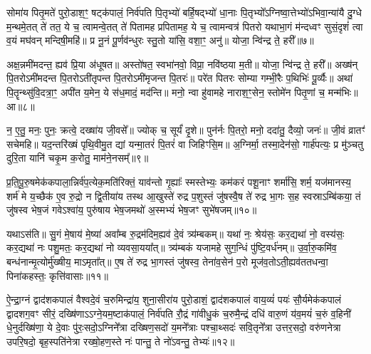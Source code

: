 {\anuvakamend[{ह॒रा॒ नि॒हारं॑ त्रि॒ꣳ॒शच्च॑॥४॥}]}

सोमा॑य पितृ॒मते॑ पुरो॒डाश॒ꣳ॒ षट्क॑पालं॒ निर्व॑पति पि॒तृभ्यो॑ बर्\mbox{}हि॒षद्भ्यो॑ धा॒नाः पि॒तृभ्यो᳚\-ऽग्निष्वा॒त्तेभ्यो॑\-ऽभिवा॒न्या॑यै दु॒ग्धे म॒न्थमे॒तत् ते॑ तत॒ ये च॒ त्वामन्वे॒तत् ते॑ पितामह प्रपितामह॒ ये च॒ त्वामन्वत्र॑ पितरो यथाभा॒गं म॑न्दध्वꣳ सुसं॒दृशं॑ त्वा व॒यं मघ॑वन् मन्दिषी॒महि॑॥ प्र नू॒नं पू॒र्णव॑न्धुरः स्तु॒तो या॑सि॒ वशा॒ꣳ॒ अनु॑॥ योजा॒ न्वि॑न्द्र ते॒ हरी᳚॥७॥

अक्ष॒न्नमी॑मदन्त॒ ह्यव॑ प्रि॒या अ॑धूषत॥ अस्तो॑षत॒ स्वभा॑नवो॒ विप्रा॒ नवि॑ष्ठया म॒ती॥ योजा॒ न्वि॑न्द्र ते॒ हरी᳚॥ अख्ष॑न् पि॒तरो\-ऽमी॑मदन्त पि॒तरो\-ऽती॑तृपन्त पि॒तरो\-ऽमी॑मृजन्त पि॒तरः॑॥ परे॑त पितरः सोम्या गम्भी॒रैः प॒थिभिः॑ पू॒र्व्यैः॥ अथा॑ पि॒तॄन्थ्सु॑वि॒दत्रा॒ꣳ॒ अपी॑त य॒मेन॒ ये स॑ध॒मादं॒ मद॑न्ति॥ मनो॒ न्वा हु॑वामहे नाराश॒ꣳ॒सेन॒ स्तोमे॑न पितृ॒णां च॒ मन्म॑भिः॥ आ॥८॥

न॒ ए॒तु॒ मनः॒ पुनः॒ क्रत्वे॒ दख्षा॑य जी॒वसे᳚॥ ज्योक् च॒ सूर्यं॑ दृ॒शे॥ पुन॑र्नः पि॒तरो॒ मनो॒ ददा॑तु॒ दैव्यो॒ जनः॑॥ जी॒वं व्रातꣳ॑ सचेमहि॥ यद॒न्तरि॑ख्षं पृथि॒वीमु॒त द्यां यन्मा॒तरं॑ पि॒तरं॑ वा जिहिꣳसि॒म॥ अ॒ग्निर्मा॒ तस्मा॒देन॑सो॒ गार्\mbox{}ह॑पत्यः॒ प्र मु॑ञ्चतु दुरि॒ता यानि॑ चकृ॒म क॒रोतु॒ माम॑ने॒नसम्᳚॥९॥

{\anuvakamend[{हरी॒ मन्म॑भि॒रा चतु॑श्चत्वारिꣳशच्च॥५॥}]}

प्र॒ति॒पू॒रु॒षमेक॑कपाला॒न्निर्व॑प॒त्येक॒मति॑रिक्तं॒ याव॑न्तो गृ॒ह्याः᳚ स्मस्तेभ्यः॒ कम॑करं पशू॒नाꣳ शर्मा॑सि॒ शर्म॒ यज॑मानस्य॒ शर्म॑ मे य॒च्छैक॑ ए॒व रु॒द्रो न द्वि॒तीया॑य तस्थ आ॒खुस्ते॑ रुद्र प॒शुस्तं जु॑षस्वै॒ष ते॑ रुद्र भा॒गः स॒ह स्वस्रा\-ऽम्बि॑कया॒ तं जु॑षस्व भेष॒जं गवे\-ऽश्वा॑य॒ पुरु॑षाय भेष॒जमथो॑ अ॒स्मभ्यं॑ भेष॒जꣳ सुभे॑षजम्॥१०॥

यथा\-ऽस॑ति॥ सु॒गं मे॒षाय॑ मे॒ष्या॑ अवा᳚म्ब रु॒द्रम॑दिम॒ह्यव॑ दे॒वं त्र्य॑म्बकम्॥ यथा॑ नः॒ श्रेय॑सः॒ कर॒द्यथा॑ नो॒ वस्य॑सः॒ कर॒द्यथा॑ नः पशु॒मतः॒ कर॒द्यथा॑ नो व्यवसा॒यया᳚त्॥ त्र्य॑म्बकं यजामहे सुग॒न्धिं पु॑ष्टि॒वर्ध॑नम्॥ उ॒र्वा॒रु॒कमि॑व॒ बन्ध॑नान्मृ॒त्योर्मु॑ख्षीय॒ मा\-ऽमृता᳚त्॥ ए॒ष ते॑ रुद्र भा॒गस्तं जु॑षस्व॒ तेना॑व॒सेन॑ प॒रो मूज॑व॒तो\-ऽती॒ह्यव॑ततधन्वा॒ पिना॑कहस्तः॒ कृत्ति॑वासाः॥११॥

{\anuvakamend[{सुभे॑षजमिहि॒ त्रीणि॑ च॥६॥}]}

ऐ॒न्द्रा॒ग्नं द्वाद॑शकपालं वैश्वदे॒वं च॒रुमिन्द्रा॑य॒ शुना॒सीरा॑य पुरो॒डाशं॒ द्वाद॑शकपालं वाय॒व्यं॑ पयः॑ सौ॒र्यमेक॑कपालं द्वादशग॒वꣳ सीरं॒ दख्षि॑णा\-ऽ\-ऽग्ने॒यम॒ष्टाक॑पालं॒ निर्व॑पति रौ॒द्रं गा॑वीधु॒कं च॒रुमै॒न्द्रं दधि॑ वारु॒णं य॑व॒मयं॑ च॒रुं व॒हिनी॑ धे॒नुर्दख्षि॑णा॒ ये दे॒वाः पु॑रः॒सदो॒\-ऽग्निने᳚त्रा दख्षिण॒सदो॑ य॒मने᳚त्राः पश्चा॒थ्सदः॑ सवि॒तृने᳚त्रा उत्तर॒सदो॒ वरु॑णनेत्रा उपरि॒षदो॒ बृह॒स्पति॑नेत्रा रख्षो॒हण॒स्ते नः॑ पान्तु॒ ते नो॑\-ऽवन्तु॒ तेभ्यः॑॥१२॥

